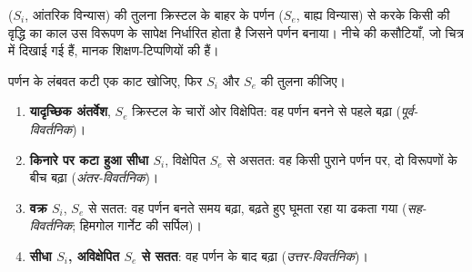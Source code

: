  ($S_i$, आंतरिक विन्यास) की तुलना क्रिस्टल के बाहर के पर्णन ($S_e$, बाह्य विन्यास) से करके
किसी  की वृद्धि का काल उस विरूपण के सापेक्ष निर्धारित होता है जिसने पर्णन बनाया। नीचे की
कसौटियाँ, जो चित्र में दिखाई गई हैं, मानक शिक्षण-टिप्पणियों की हैं।

\begin{method}[अंतर्वेश-पथों से किसी पॉर्फ़िरोब्लास्ट का काल-निर्धारण]\label{met:b2:field-lab-methods-2:timing}
पर्णन के लंबवत कटी एक काट खोजिए, फिर $S_i$ और $S_e$ की तुलना कीजिए।
\begin{enumerate}
  \item \textbf{यादृच्छिक अंतर्वेश}, $S_e$ क्रिस्टल के चारों ओर विक्षेपित: वह पर्णन बनने से
        पहले बढ़ा (\emph{पूर्व-विवर्तनिक})।
  \item \textbf{किनारे पर कटा हुआ सीधा $S_i$}, विक्षेपित $S_e$ से असतत: वह
        किसी पुराने पर्णन पर, दो विरूपणों के बीच बढ़ा (\emph{अंतर-विवर्तनिक})।
  \item \textbf{वक्र $S_i$}, $S_e$ से सतत: वह पर्णन बनते समय बढ़ा, बढ़ते हुए घूमता
        रहा या ढकता गया (\emph{सह-विवर्तनिक}; हिमगोल गार्नेट की सर्पिल)।
  \item \textbf{सीधा $S_i$, अविक्षेपित $S_e$ से सतत}: वह पर्णन के बाद
        बढ़ा (\emph{उत्तर-विवर्तनिक})।
\end{enumerate}
\end{method}

